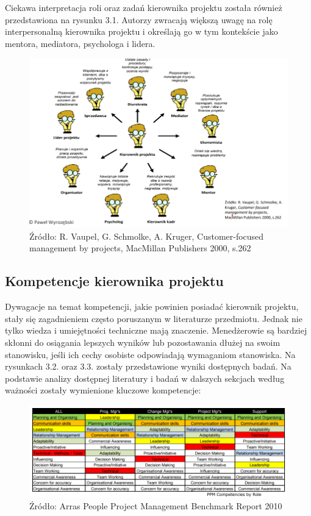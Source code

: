 Ciekawa interpretacja roli oraz zadań kierownika projektu została również przedstawiona na rysunku 3.1. Autorzy zwracają większą uwagę na rolę interpersonalną kierownika projektu i określają go w tym kontekście jako mentora, mediatora, psychologa i lidera.
\begin{figure}
\centering
\includegraphics[width=14cm]{img/rola.png}
\caption{Źródło: R. Vaupel, G. Schmolke, A. Kruger, Customer-focused management by projects, MacMillan Publishers 2000, s.262}
\end{figure}

\subsection{Kompetencje kierownika projektu}
Dywagacje na temat kompetencji, jakie powinien posiadać kierownik projektu, stały się zagadnieniem często poruszanym w literaturze przedmiotu. Jednak nie tylko wiedza i umiejętności techniczne mają znaczenie. Menedżerowie są bardziej skłonni do osiągania lepszych wyników lub pozostawania dłużej na swoim stanowisku, jeśli ich cechy osobiste odpowiadają wymaganiom stanowiska.\autocite{MUMFORD200011}
Na rysunkach 3.2. oraz 3.3. zostały przedstawione wyniki dostępnych badań.
Na podstawie analizy dostępnej literatury i badań w dalszych sekcjach według ważności zostały wymienione kluczowe kompetencje: \autocite{analizaMulti} \autocite{Alvarenga} \autocite{arras2010} \autocite{ziek} \autocite{brill} \autocite{arras2015}

\begin{figure}
\centering
\includegraphics[width=14cm]{img/kompetencje.png}
\caption{Źródło: Arras People Project Management Benchmark Report 2010 }
\end{figure}

